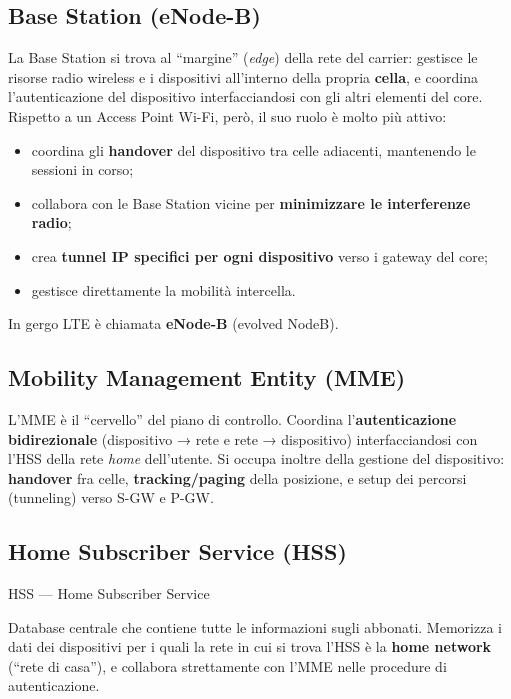 \documentclass[
  italian,
  openany]{book}
\providecommand{\tightlist}{%
  \setlength{\itemsep}{0pt}\setlength{\parskip}{0pt}}
\begin{document}
\subsection{Base Station (eNode-B)}\label{base-station-enode-b}

La Base Station si trova al ``margine'' (\emph{edge}) della rete del
carrier: gestisce le risorse radio wireless e i dispositivi all'interno
della propria \textbf{cella}, e coordina l'autenticazione del
dispositivo interfacciandosi con gli altri elementi del core. Rispetto a
un Access Point Wi-Fi, però, il suo ruolo è molto più attivo:

\begin{itemize}
\tightlist
\item
  coordina gli \textbf{handover} del dispositivo tra celle adiacenti,
  mantenendo le sessioni in corso;
\item
  collabora con le Base Station vicine per \textbf{minimizzare le
  interferenze radio};
\item
  crea \textbf{tunnel IP specifici per ogni dispositivo} verso i gateway
  del core;
\item
  gestisce direttamente la mobilità intercella.
\end{itemize}

In gergo LTE è chiamata \textbf{eNode-B} (evolved NodeB).

\subsection{Mobility Management Entity
(MME)}\label{mobility-management-entity-mme}

L'MME è il ``cervello'' del piano di controllo. Coordina
l'\textbf{autenticazione bidirezionale} (dispositivo → rete e rete →
dispositivo) interfacciandosi con l'HSS della rete \emph{home}
dell'utente. Si occupa inoltre della gestione del dispositivo:
\textbf{handover} fra celle, \textbf{tracking/paging} della posizione, e
setup dei percorsi (tunneling) verso S-GW e P-GW.

\subsection{Home Subscriber Service
(HSS)}\label{home-subscriber-service-hss}

\begin{calloutdefinition}{HSS — Home Subscriber Service}

Database centrale che contiene tutte le informazioni sugli abbonati.
Memorizza i dati dei dispositivi per i quali la rete in cui si trova
l'HSS è la \textbf{home network} (``rete di casa''), e collabora
strettamente con l'MME nelle procedure di autenticazione.

\end{calloutdefinition}
\end{document}
